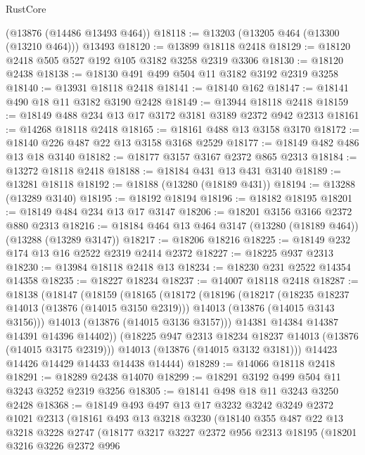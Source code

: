 \begin{lexlean}{RustCore}
\begin{coremodule}
    (@13876 (@14486 @13493 @464))
@18118 := @13203 (@13205 @464 (@13300 (@13210 @464))) @13493
@18120 := @13899 @18118 @2418
@18129 := @18120 @2418 @505 @527 @192 @105 @3182 @3258 @2319 @3306
@18130 := @18120 @2438
@18138 := @18130 @491 @499 @504 @11 @3182 @3192 @2319 @3258
@18140 := @13931 @18118 @2418
@18141 := @18140 @162
@18147 := @18141 @490 @18 @11 @3182 @3190 @2428
@18149 := @13944 @18118 @2418
@18159 := @18149 @488 @234 @13 @17 @3172 @3181 @3189 @2372 @942 @2313
@18161 := @14268 @18118 @2418
@18165 := @18161 @488 @13 @3158 @3170
@18172 := @18140 @226 @487 @22 @13 @3158 @3168 @2529
@18177 := @18149 @482 @486 @13 @18 @3140
@18182 := @18177 @3157 @3167 @2372 @865 @2313
@18184 := @13272 @18118 @2418
@18188 := @18184 @431 @13 @431 @3140
@18189 := @13281 @18118
@18192 := @18188 (@13280 (@18189 @431))
@18194 := @13288 (@13289 @3140)
@18195 := @18192 @18194
@18196 := @18182 @18195
@18201 := @18149 @484 @234 @13 @17 @3147
@18206 := @18201 @3156 @3166 @2372 @880 @2313
@18216 := @18184 @464 @13 @464 @3147 (@13280 (@18189 @464)) (@13288 (@13289 @3147))
@18217 := @18206 @18216
@18225 := @18149 @232 @174 @13 @16 @2522 @2319 @2414 @2372
@18227 := @18225 @937 @2313
@18230 := @13984 @18118 @2418 @13
@18234 := @18230 @231 @2522 @14354 @14358
@18235 := @18227 @18234
@18237 := @14007 @18118 @2418
@18287 := @18138
    (@18147
      (@18159
        (@18165
          (@18172
            (@18196
              (@18217
                (@18235 @18237 @14013 (@13876 (@14015 @3150 @2319)))
                @14013
                (@13876 (@14015 @3143 @3156)))
              @14013
              (@13876 (@14015 @3136 @3157)))
            @14381
            @14384
            @14387
            @14391
            @14396
            @14402))
        (@18225 @947 @2313 @18234 @18237 @14013 (@13876 (@14015 @3175 @2319)))
        @14013
        (@13876 (@14015 @3132 @3181)))
      @14423
      @14426
      @14429
      @14433
      @14438
      @14444)
@18289 := @14066 @18118 @2418
@18291 := @18289 @2438 @14070
@18299 := @18291 @3192 @499 @504 @11 @3243 @3252 @2319 @3256
@18305 := @18141 @498 @18 @11 @3243 @3250 @2428
@18368 := @18149
    @493
    @497
    @13
    @17
    @3232
    @3242
    @3249
    @2372
    @1021
    @2313
    (@18161
      @493
      @13
      @3218
      @3230
      (@18140
        @355
        @487
        @22
        @13
        @3218
        @3228
        @2747
        (@18177
          @3217
          @3227
          @2372
          @956
          @2313
          @18195
          (@18201
            @3216
            @3226
            @2372
            @996

\end{coremodule}
\end{lexlean}
